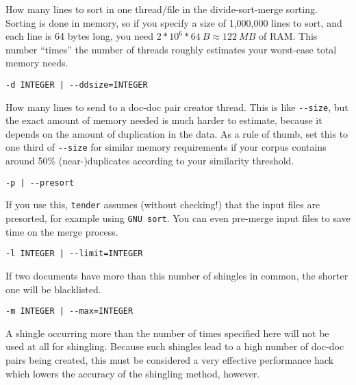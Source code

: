 \documentclass[12pt,a4paper]{article}
\newcommand{\Maro}[1]{\marginpar{\tiny\texttt{#1}}}
\begin{document}
How many lines to sort in one thread/file in the divide-sort-merge sorting.
Sorting is done in memory, so if you specify a size of 1,000,000 lines to sort, and each line is 64 bytes long, you need $2*10^6*64~B\approx 122~MB$ of RAM.
This number ``times'' the number of threads roughly estimates your worst-case total memory needs.

\begin{center}\Maro{-d|-{-}ddsize}
\begin{verbatim}
-d INTEGER | --ddsize=INTEGER
\end{verbatim}
\end{center}

How many lines to send to a doc-doc pair creator thread.
This is like \texttt{-{-}size}, but the exact amount of memory needed is much harder to estimate, because it depends on the amount of duplication in the data.
As a rule of thumb, set this to one third of \texttt{-{-}size} for similar memory requirements if your corpus contains around 50\% (near-)duplicates according to your similarity threshold.

\begin{center}\Maro{-p|-{-}presort}
\begin{verbatim}
-p | --presort
\end{verbatim}
\end{center}

If you use this, \texttt{tender} assumes (without checking!) that the input files are presorted, for example using \texttt{GNU sort}.
You can even pre-merge input files to save time on the merge process.

\begin{center}\Maro{-l|-{-}limit}
\begin{verbatim}
-l INTEGER | --limit=INTEGER
\end{verbatim}
\end{center}

If two documents have more than this number of shingles in common, the shorter one will be blacklisted.

\begin{center}\Maro{-m|-{-}max}
\begin{verbatim}
-m INTEGER | --max=INTEGER
\end{verbatim}
\end{center}

A shingle occurring more than the number of times specified here will not be used at all for shingling.
Because such shingles lead to a high number of doc-doc pairs being created, this must be considered a very effective performance hack which lowers the accuracy of the shingling method, however.
\end{document}
